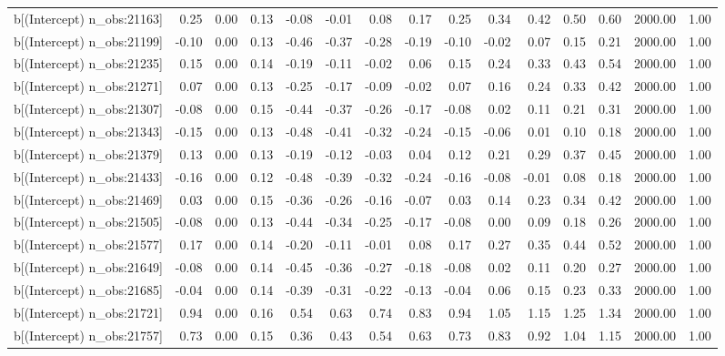 \begin{table}[ht]
\begin{tabular}{rrrrrrrrrrrrrrr}
  b[(Intercept) n\_obs:21163] & 0.25 & 0.00 & 0.13 & -0.08 & -0.01 & 0.08 & 0.17 & 0.25 & 0.34 & 0.42 & 0.50 & 0.60 & 2000.00 & 1.00 \\ 
  b[(Intercept) n\_obs:21199] & -0.10 & 0.00 & 0.13 & -0.46 & -0.37 & -0.28 & -0.19 & -0.10 & -0.02 & 0.07 & 0.15 & 0.21 & 2000.00 & 1.00 \\ 
  b[(Intercept) n\_obs:21235] & 0.15 & 0.00 & 0.14 & -0.19 & -0.11 & -0.02 & 0.06 & 0.15 & 0.24 & 0.33 & 0.43 & 0.54 & 2000.00 & 1.00 \\ 
  b[(Intercept) n\_obs:21271] & 0.07 & 0.00 & 0.13 & -0.25 & -0.17 & -0.09 & -0.02 & 0.07 & 0.16 & 0.24 & 0.33 & 0.42 & 2000.00 & 1.00 \\ 
  b[(Intercept) n\_obs:21307] & -0.08 & 0.00 & 0.15 & -0.44 & -0.37 & -0.26 & -0.17 & -0.08 & 0.02 & 0.11 & 0.21 & 0.31 & 2000.00 & 1.00 \\ 
  b[(Intercept) n\_obs:21343] & -0.15 & 0.00 & 0.13 & -0.48 & -0.41 & -0.32 & -0.24 & -0.15 & -0.06 & 0.01 & 0.10 & 0.18 & 2000.00 & 1.00 \\ 
  b[(Intercept) n\_obs:21379] & 0.13 & 0.00 & 0.13 & -0.19 & -0.12 & -0.03 & 0.04 & 0.12 & 0.21 & 0.29 & 0.37 & 0.45 & 2000.00 & 1.00 \\ 
  b[(Intercept) n\_obs:21433] & -0.16 & 0.00 & 0.12 & -0.48 & -0.39 & -0.32 & -0.24 & -0.16 & -0.08 & -0.01 & 0.08 & 0.18 & 2000.00 & 1.00 \\ 
  b[(Intercept) n\_obs:21469] & 0.03 & 0.00 & 0.15 & -0.36 & -0.26 & -0.16 & -0.07 & 0.03 & 0.14 & 0.23 & 0.34 & 0.42 & 2000.00 & 1.00 \\ 
  b[(Intercept) n\_obs:21505] & -0.08 & 0.00 & 0.13 & -0.44 & -0.34 & -0.25 & -0.17 & -0.08 & 0.00 & 0.09 & 0.18 & 0.26 & 2000.00 & 1.00 \\ 
  b[(Intercept) n\_obs:21577] & 0.17 & 0.00 & 0.14 & -0.20 & -0.11 & -0.01 & 0.08 & 0.17 & 0.27 & 0.35 & 0.44 & 0.52 & 2000.00 & 1.00 \\ 
  b[(Intercept) n\_obs:21649] & -0.08 & 0.00 & 0.14 & -0.45 & -0.36 & -0.27 & -0.18 & -0.08 & 0.02 & 0.11 & 0.20 & 0.27 & 2000.00 & 1.00 \\ 
  b[(Intercept) n\_obs:21685] & -0.04 & 0.00 & 0.14 & -0.39 & -0.31 & -0.22 & -0.13 & -0.04 & 0.06 & 0.15 & 0.23 & 0.33 & 2000.00 & 1.00 \\ 
  b[(Intercept) n\_obs:21721] & 0.94 & 0.00 & 0.16 & 0.54 & 0.63 & 0.74 & 0.83 & 0.94 & 1.05 & 1.15 & 1.25 & 1.34 & 2000.00 & 1.00 \\ 
  b[(Intercept) n\_obs:21757] & 0.73 & 0.00 & 0.15 & 0.36 & 0.43 & 0.54 & 0.63 & 0.73 & 0.83 & 0.92 & 1.04 & 1.15 & 2000.00 & 1.00 \\ 

\end{tabular}
\end{table}
